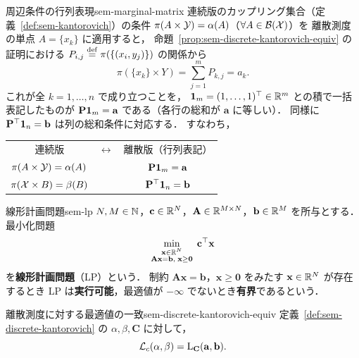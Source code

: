 \begin{remark}{周辺条件の行列表現}{sem-marginal-matrix}
  連続版のカップリング集合（定義~\ref{def:sem-kantorovich}）の条件
  $\pi(A \times \mathcal{Y}) = \alpha(A)$（$\forall A \in \mathcal{B}(\mathcal{X})$）を
  離散測度の単点 $A = \{x_k\}$ に適用すると，
  命題~\ref{prop:sem-discrete-kantorovich-equiv} の証明における $P_{i,j} \overset{\mathrm{def}}{=} \pi(\{(x_i, y_j)\})$ の関係から
  \[
    \pi(\{x_k\} \times Y) = \sum_{j=1}^m P_{k,j} = a_k.
  \]
  これが全 $k = 1, \ldots, n$ で成り立つことを，
  $\mathbf{1}_m = (1, \ldots, 1)^\top \in \mathbb{R}^m$ との積で一括表記したものが
  $\mathbf{P} \mathbf{1}_m = \mathbf{a}$ である（各行の総和が $\mathbf{a}$ に等しい）．
  同様に $\mathbf{P}^\top \mathbf{1}_n = \mathbf{b}$ は列の総和条件に対応する．
  すなわち，

  \begin{center}
  \begin{tabular}{ccc}
    連続版 & $\longleftrightarrow$ & 離散版（行列表記） \\[4pt]
    $\pi(A \times \mathcal{Y}) = \alpha(A)$ & & $\mathbf{P} \mathbf{1}_m = \mathbf{a}$ \\[2pt]
    $\pi(\mathcal{X} \times B) = \beta(B)$ & & $\mathbf{P}^\top \mathbf{1}_n = \mathbf{b}$
  \end{tabular}
  \end{center}
\end{remark}

\begin{definition}{線形計画問題}{sem-lp}
  $N, M \in \mathbb{N}$，$\mathbf{c} \in \mathbb{R}^N$，$\mathbf{A} \in \mathbb{R}^{M \times N}$，$\mathbf{b} \in \mathbb{R}^M$ を所与とする．
  最小化問題
  \[
    \min_{\substack{\mathbf{x} \in \mathbb{R}^N \\ \mathbf{A}\mathbf{x} = \mathbf{b},\; \mathbf{x} \geq \mathbf{0}}}\;
    \mathbf{c}^\top \mathbf{x}
  \]
  を\textbf{線形計画問題}（LP）という．
  制約 $\mathbf{A}\mathbf{x} = \mathbf{b}$，$\mathbf{x} \geq \mathbf{0}$ をみたす $\mathbf{x} \in \mathbb{R}^N$ が存在するとき
  LP は\textbf{実行可能}，最適値が $-\infty$ でないとき\textbf{有界}であるという．
\end{definition}

\begin{proposition}{離散測度に対する最適値の一致}{sem-discrete-kantorovich-equiv}
  定義~\ref{def:sem-discrete-kantorovich} の $\alpha, \beta, \mathbf{C}$ に対して，
  \[
    \mathcal{L}_c(\alpha, \beta) = \mathrm{L}_{\mathbf{C}}(\mathbf{a}, \mathbf{b}).
  \]
\end{proposition}

